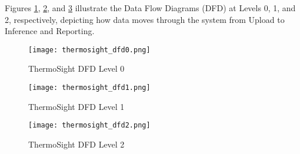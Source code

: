 Figures \ref{fig:ts_dfd0}, \ref{fig:ts_dfd1}, and \ref{fig:ts_dfd2} illustrate the Data Flow Diagrams (DFD) at Levels 0, 1, and 2, respectively, depicting how data moves through the system from Upload to Inference and Reporting.

\begin{figure}[H]
    \centering
    \texttt{[image: thermosight\_dfd0.png]}
    \caption{ThermoSight DFD Level 0}
    \label{fig:ts_dfd0}
\end{figure}

\begin{figure}[H]
    \centering
    \texttt{[image: thermosight\_dfd1.png]}
    \caption{ThermoSight DFD Level 1}
    \label{fig:ts_dfd1}
\end{figure}

\begin{figure}[H]
    \centering
    \texttt{[image: thermosight\_dfd2.png]}
    \caption{ThermoSight DFD Level 2}
    \label{fig:ts_dfd2}
\end{figure}
